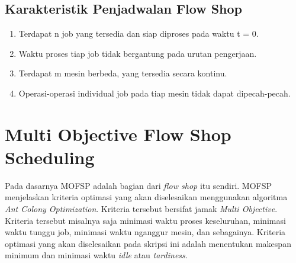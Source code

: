 \subsection{Karakteristik Penjadwalan Flow Shop}
\begin{enumerate}
	\item Terdapat n job yang tersedia dan siap diproses pada waktu t = 0.
	\item Waktu proses tiap job tidak bergantung pada urutan pengerjaan.
	\item Terdapat m mesin berbeda, yang tersedia secara kontinu.
	\item Operasi-operasi individual job pada tiap mesin tidak dapat dipecah-pecah.
\end{enumerate}

\section{Multi Objective Flow Shop Scheduling}
Pada dasarnya MOFSP adalah bagian dari {\it flow shop } itu sendiri. MOFSP menjelaskan kriteria optimasi yang akan diselesaikan menggunakan algoritma {\it Ant Colony Optimization}. Kriteria tersebut bersifat jamak {\it Multi Objective}. Kriteria tersebut misalnya saja minimasi waktu proses keseluruhan, minimasi waktu tunggu job, minimasi waktu nganggur mesin, dan sebagainya. Kriteria optimasi yang akan diselesaikan pada skripsi ini adalah menentukan makespan minimum dan minimasi waktu {\it idle} atau {\it tardiness}.

